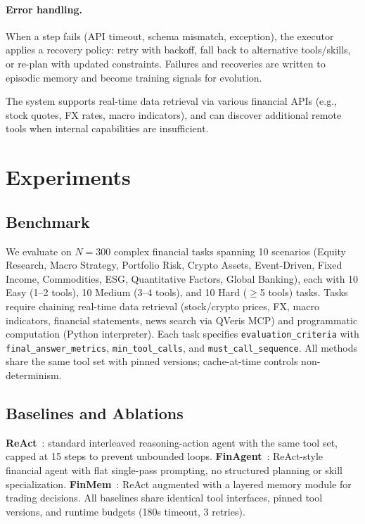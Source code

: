 \documentclass{article}
\begin{document}
\paragraph{Error handling.}
When a step fails (API timeout, schema mismatch, exception), the executor applies a recovery policy: retry with backoff, fall back to alternative tools/skills, or re-plan with updated constraints. Failures and recoveries are written to episodic memory and become training signals for evolution.

The system supports real-time data retrieval via various financial APIs (e.g., stock quotes, FX rates, macro indicators), and can discover additional remote tools when internal capabilities are insufficient.

\section{Experiments}
\subsection{Benchmark}
We evaluate on $N=300$ complex financial tasks spanning 10 scenarios (Equity Research, Macro Strategy, Portfolio Risk, Crypto Assets, Event-Driven, Fixed Income, Commodities, ESG, Quantitative Factors, Global Banking), each with 10 Easy (1--2 tools), 10 Medium (3--4 tools), and 10 Hard ($\ge$5 tools) tasks. Tasks require chaining real-time data retrieval (stock/crypto prices, FX, macro indicators, financial statements, news search via QVeris MCP) and programmatic computation (Python interpreter). Each task specifies \texttt{evaluation\_criteria} with \texttt{final\_answer\_metrics}, \texttt{min\_tool\_calls}, and \texttt{must\_call\_sequence}. All methods share the same tool set with pinned versions; cache-at-time controls non-determinism.

\subsection{Baselines and Ablations}
\textbf{ReAct}~\citep{yao2023react}: standard interleaved reasoning-action agent with the same tool set, capped at 15 steps to prevent unbounded loops. \textbf{FinAgent}~\citep{tradingagents2024}: ReAct-style financial agent with flat single-pass prompting, no structured planning or skill specialization. \textbf{FinMem}~\citep{finmem2023}: ReAct augmented with a layered memory module for trading decisions. All baselines share identical tool interfaces, pinned tool versions, and runtime budgets (180s timeout, 3 retries).
\end{document}

